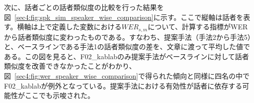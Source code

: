 \documentclass[12pt]{jarticle}
\numberwithin{equation}{section}    %
\numberwithin{figure}{section}      %
\numberwithin{table}{section}      %
\begin{document}
次に、話者ごとの話者類似度の比較を行った結果を図~\ref{sec4:fig:spk_sim_speaker_wise_comparison}に示す。ここで縦軸は話者を表す。横軸は上で定義した変数における$WER_{s, m}$について、計算する指標がWERから話者類似度に変わったものである。すなわち、提案手法（手法2から手法5）と、ベースラインである手法1の話者類似度の差を、文章に渡って平均した値である。この図を見ると、F02\_kablabのみ提案手法がベースラインに対して話者類似度を改善できなかったことがわかり、図~\ref{sec4:fig:wer_speaker_wise_comparison}で得られた傾向と同様に四名の中でF02\_kablabが例外となっている。提案手法における有効性が話者に依存する可能性がここでも示唆された。

\begin{table}[bt]
    \centering
    \caption{損失関数の重み係数による客観評価指標の比較}
    \label{sec4:tab:obj_weights}
    \begin{center}
        \renewcommand{\arraystretch}{1.0} %
        \setlength{\tabcolsep}{8pt}      %
\end{center}
\end{table}
\end{document}
